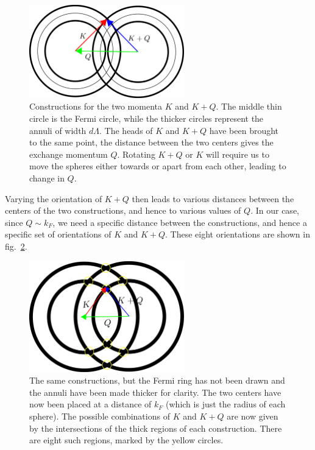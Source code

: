 \documentclass[14pt]{extarticle}
\begin{document}
\begin{figure}[!htpb]
	\centering
	\includegraphics[width=0.6\textwidth]{./figures/overlap.pdf}
	\caption{Constructions for the two momenta \(K\) and \(K+Q\). The middle thin circle is the Fermi circle, while the thicker circles represent the annuli of width \(d\Lambda\). The heads of \(K\) and \(K+Q\) have been brought to the same point, the distance between the two centers gives the exchange momentum \(Q\). Rotating \(K+Q\) or \(K\) will require us to move the spheres either towards or apart from each other, leading to change in \(Q\).}
	\label{overlap}
\end{figure}

Varying the orientation of \(K+Q\) then leads to various distances between the centers of the two constructions, and hence to various values of \(Q\). In our case, since \(Q \sim k_F\), we need a specific distance between the constructions, and hence a specific set of orientations of \(K\) and \(K+Q\). These eight orientations are shown in fig.~\ref{overlap_survive}. 

\begin{figure}[!htpb]
	\centering
	\includegraphics[width=0.6\textwidth]{./figures/overlap_survive.pdf}
	\caption{The same constructions, but the Fermi ring has not been drawn and the annuli have been made thicker for clarity.  The two centers have now been placed at a distance of \(k_F\) (which is just the radius of each sphere). The possible combinations of \(K\) and \(K+Q\) are now given by the intersections of the thick regions of each construction. There are eight such regions, marked by the yellow circles.}
	\label{overlap_survive}
\end{figure}
\end{document}
